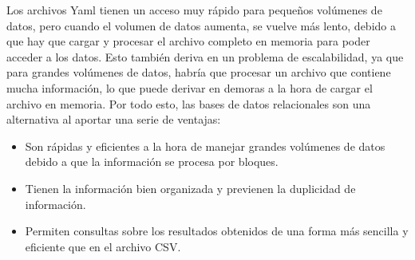 

Los archivos \acrshort{Yaml} tienen un acceso muy rápido para pequeños volúmenes de datos, pero cuando el volumen de datos aumenta, se vuelve más lento, debido a que hay que cargar y procesar el archivo completo en memoria para poder acceder a los datos. Esto también deriva en un problema de escalabilidad, ya que para grandes volúmenes de datos, habría que procesar un archivo que contiene mucha información, lo que puede derivar en demoras a la hora de cargar el archivo en memoria. Por todo esto, las bases de datos relacionales son una alternativa al aportar una serie de ventajas:
\begin{itemize}
    \item Son rápidas y eficientes a la hora de manejar grandes volúmenes de datos debido a que la información se procesa por bloques.
    \item Tienen la información bien organizada y previenen la duplicidad de información.
    \item Permiten consultas sobre los resultados obtenidos de una forma más sencilla y eficiente que en el archivo \acrshort{CSV}.
\end{itemize}

